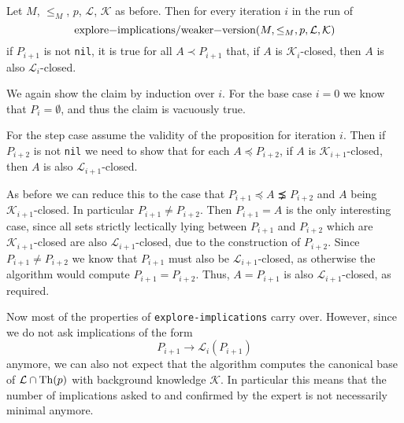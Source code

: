 \begin{Proposition}
  \label{prop:explore-implications-weaker-version-closedness-persists}
  Let $M$, $\leq_{M}$, $p$, $\mathcal{L}$, $\mathcal{K}$ as before.  Then for every
  iteration $i$ in the run of
  \begin{equation*}
    \text{\lstinline{explore-implications/weaker-version}}(M, \leq_{M}, p, \mathcal{L}, \mathcal{K})
  \end{equation*}
  if $P_{i+1}$ is not \lstinline{nil}, it is true for all $A \prec P_{i+1}$ that, if $A$
  is $\mathcal{K}_{i}$-closed, then $A$ is also $\mathcal{L}_{i}$-closed.
\end{Proposition}
\begin{Proof}
  We again show the claim by induction over $i$.  For the base case $i = 0$ we know that
  $P_{i} = \emptyset$, and thus the claim is vacuously true.

  For the step case assume the validity of the proposition for iteration $i$.  Then if
  $P_{i+2}$ is not \lstinline{nil} we need to show that for each $A \preceq P_{i+2}$, if
  $A$ is $\mathcal{K}_{i+1}$-closed, then $A$ is also $\mathcal{L}_{i+1}$-closed.

  As before we can reduce this to the case that $P_{i+1} \preceq A \precneq P_{i+2}$ and
  $A$ being $\mathcal{K}_{i+1}$-closed.  In particular $P_{i+1} \neq P_{i+2}$.  Then
  $P_{i+1} = A$ is the only interesting case, since all sets strictly lectically lying
  between $P_{i+1}$ and $P_{i+2}$ which are $\mathcal{K}_{i+1}$-closed are also
  $\mathcal{L}_{i+1}$-closed, due to the construction of $P_{i+2}$.  Since $P_{i+1} \neq
  P_{i+2}$ we know that $P_{i+1}$ must also be $\mathcal{L}_{i+1}$-closed, as otherwise
  the algorithm would compute $P_{i+1} = P_{i+2}$.  Thus, $A = P_{i+1}$ is also
  $\mathcal{L}_{i+1}$-closed, as required.
\end{Proof}

Now most of the properties of \lstinline{explore-implications} carry over.  However, since
we do not ask implications of the form
\begin{equation}
  \label{eq:39}
  P_{i+1} \to \mathcal{L}_{i}(P_{i+1})
\end{equation}
anymore, we can also not expect that the algorithm computes the canonical base of
$\mathcal{L} \cap \operatorname{Th}(p)$ with background knowledge $\mathcal{K}$.  In particular this
means that the number of implications asked to and confirmed by the expert is not
necessarily minimal anymore.

